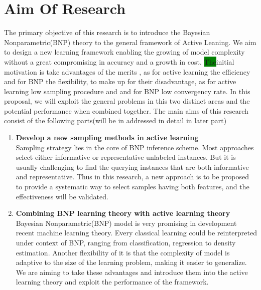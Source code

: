 \section{Aim Of Research}\label{aor}
The primary objective of this research is to introduce the Bayesian Nonparametric(BNP) theory to the general framework of Active Leaning. We aim to design a new learning framework enabling the growing of model complexity without a great compromising in accuracy and a growth in cost.
\colorbox{green}{The}initial motivation is take advantages of the merits , as for active learning the efficiency and for BNP the flexibility, to make up for their disadvantage, as for active learning low sampling procedure and and for BNP low convergency rate\cite{gershman2012tutorial,escobar1995bayesian,Settles2010}. In this proposal, we will exploit the general problems in this two distinct areas and the  potential performance when combined together.  The main aims of this research consist of the following parts(will be in addressed in detail in later part) 
\begin{enumerate}
\item{\textbf{Develop a new sampling methods in active learning}}\\
 Sampling strategy lies in the core of BNP inference scheme. Most approaches select either informative or representative unlabeled instances. But it is usually challenging to find the querying instances that are both informative and representative. Thus in this research, a new approach is to be proposed to provide a systematic way to select samples having both features, and the effectiveness will be validated.
 
\item{\textbf{Combining BNP learning theory with active learning theory  }}\\

 Bayesian Nonparametric(BNP) model is very promising in development recent machine learning theory. Every classical learning could be reinterpreted under context of BNP, ranging from classification, regression to density estimation. Another flexibility of it is that the complexity of model is adaptive to the size of the learning problem, making it easier to generalize. We are aiming to take these advantages and introduce them into the active learning theory and exploit the performance of the framework.  
\end{enumerate}

